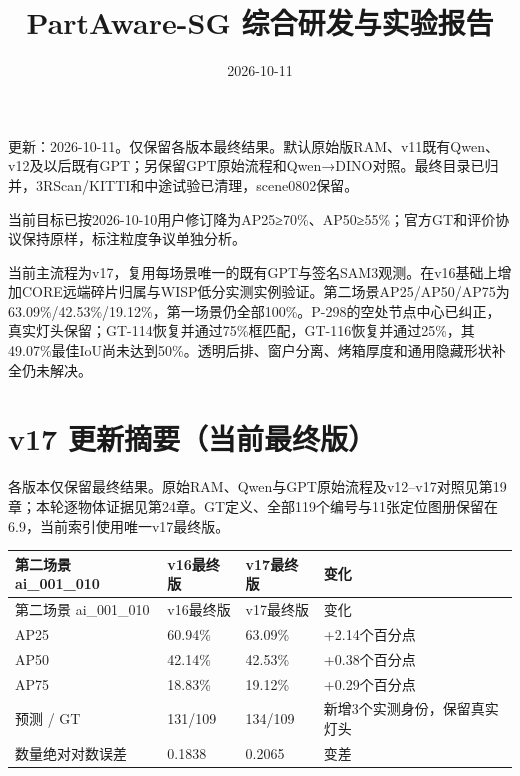 \documentclass[UTF8,fontset=fandol]{ctexart}
\title{PartAware-SG 综合研发与实验报告}
\author{}
\date{2026-10-11}
\begin{document}
\maketitle
\tableofcontents
\clearpage

更新：2026-10-11。仅保留各版本最终结果。默认原始版RAM、v11既有Qwen、v12及以后既有GPT；另保留GPT原始流程和Qwen→DINO对照。最终目录已归并，3RScan/KITTI和中途试验已清理，scene0802保留。



当前目标已按2026-10-10用户修订降为AP25≥70\%、AP50≥55\%；官方GT和评价协议保持原样，标注粒度争议单独分析。



当前主流程为v17，复用每场景唯一的既有GPT与签名SAM3观测。在v16基础上增加CORE远端碎片归属与WISP低分实测实例验证。第二场景AP25/AP50/AP75为63.09\%/42.53\%/19.12\%，第一场景仍全部100\%。P-298的空处节点中心已纠正，真实灯头保留；GT-114恢复并通过75\%框匹配，GT-116恢复并通过25\%，其49.07\%最佳IoU尚未达到50\%。透明后排、窗户分离、烤箱厚度和通用隐藏形状补全仍未解决。



\section*{v17 更新摘要（当前最终版）}

各版本仅保留最终结果。原始RAM、Qwen与GPT原始流程及v12–v17对照见第19章；本轮逐物体证据见第24章。GT定义、全部119个编号与11张定位图册保留在6.9，当前索引使用唯一v17最终版。



{\small
\begin{longtable}{|p{}|p{}|p{}|p{}|}
\hline
第二场景 ai\_001\_010 & v16最终版 & v17最终版 & 变化 \\ \hline
\endfirsthead
\hline
第二场景 ai\_001\_010 & v16最终版 & v17最终版 & 变化 \\ \hline
\endhead
AP25 & 60.94\% & 63.09\% & +2.14个百分点 \\ \hline
AP50 & 42.14\% & 42.53\% & +0.38个百分点 \\ \hline
AP75 & 18.83\% & 19.12\% & +0.29个百分点 \\ \hline
预测 / GT & 131/109 & 134/109 & 新增3个实测身份，保留真实灯头 \\ \hline
数量绝对对数误差 & 0.1838 & 0.2065 & 变差 \\ \hline
\end{longtable}
}
\end{document}
